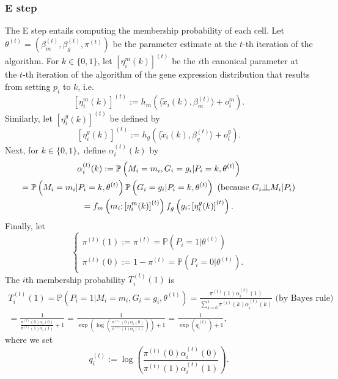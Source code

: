 \documentclass[12pt]{article}
\newcommand{\indep}{\raisebox{0.05em}{\rotatebox[origin=c]{90}{$\models$}}}
\begin{document}
\begin{appendices}
\begin{refsection}
		\subsubsection*{E step}
		The E step entails computing the membership probability of each cell. Let $\theta^{(t)} = (\beta_m^{(t)}, \beta_g^{(t)}, \pi^{(t)})$ be the parameter estimate at the $t$-th iteration of the algorithm. For $k \in \{0,1\}$, let $[\eta^m_i(k)]^{(t)}$ be the $i$th canonical parameter at the $t$-th iteration of the algorithm of the gene expression distribution that results from setting $p_i$ to $k$, i.e.
		$$
		[\eta^m_i(k)]^{(t)} := h_m\left( \langle \tilde{x}_i(k) , \beta_m^{(t)} \rangle + o^m_i \right).
		$$ Similarly, let $\left[\eta^g_i(k)\right]^{(t)}$ be defined by
		$$\left[\eta^g_i(k)\right]^{(t)} :=  h_g\left( \langle \tilde{x}_i(k) , \beta_g^{(t)} \rangle + o^g_i \right).$$
		Next, for $k \in \{0,1\},$ define $\alpha^{(t)}_i(k)$ by
		\begin{multline*}
		\alpha^{(t)}_i(k) := \mathbb{P}\left( M_i = m_i, G_i = g_i | P_i = k, \theta^{(t)} \right) \\ = \mathbb{P}\left( M_i = m_i | P_i = k, \theta^{(t)} \right) \mathbb{P}\left(G_i = g_i | P_i = k, \theta^{(t)} \right) \textrm{ (because $G_i \indep M_i | P_i$)} \\ = f_m\left(m_i; \left[ \eta^m_i(k) \right]^{(t)}\right) f_g\left(g_i; \left[ \eta^g_i(k) \right]^{(t)} \right).
		\end{multline*}
		Finally, let 
		$$
		\begin{cases}
		\pi^{(t)}(1) := \pi^{(t)} = \mathbb{P}\left(P_i = 1 | \theta^{(t)} \right) \\
		\pi^{(t)}(0) := 1 - \pi^{(t)} = \mathbb{P}\left(P_i = 0 | \theta^{(t)} \right).
		\end{cases}
		$$
		The $i$th membership probability $T^{(t)}_i(1)$ is
		\begin{multline}\label{e_step_1}
		T^{(t)}_i(1) = \mathbb{P}(P_i = 1 | M_i = m_i, G_i = g_i, \theta^{(t)})  = \frac{\pi^{(t)}(1) \alpha^{(t)}_i(1)}{ \sum_{k=0}^1 \pi^{(t)}(k) \alpha^{(t)}_i(k)} \textrm{ (by Bayes rule)} \\ = \frac{1}{\frac{ \pi^{(t)}(0) \alpha_i(0)}{\pi^{(t)}(1) \alpha_i(1)} + 1} = \frac{1}{ \exp\left(\log\left(\frac{\pi^{(t)}(0) \alpha_i(0)}{\pi^{(t)}(1) \alpha_i(1)}\right)\right) + 1} = \frac{ 1 }{ \exp\left(q^{(t)}_i\right) + 1},
		\end{multline}
		where we set 
		\begin{equation}\label{e_step_2}
		q_i^{(t)} := \log\left(\frac{\pi^{(t)}(0) \alpha_i^{(t)}(0)}{\pi^{(t)}(1) \alpha_i^{(t)}(1)}\right).

\end{equation}
\end{refsection}
\end{appendices}
\end{document}

